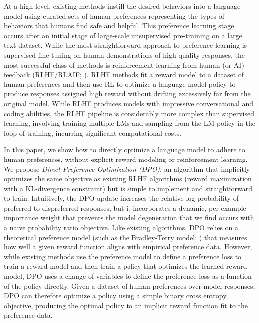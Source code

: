 \documentclass{article}
\newcommand{\rev}[2]{{#2}}
\newcommand{\methodac}{DPO}
\newcommand{\methodfull}{Direct Preference Optimization}
\begin{document}
At a high level, existing methods instill the desired behaviors into a language model using curated sets of human preferences representing the types of behaviors that humans find safe and helpful. This preference learning stage occurs after an initial stage of large-scale unsupervised pre-training on a large text dataset. While the most straightforward approach to preference learning is supervised fine-tuning on human demonstrations of high quality responses, the most successful class of methods is reinforcement learning from human (or AI) feedback (RLHF/RLAIF; \citep{christiano2017deep,bai2022constitutional}). RLHF methods fit a reward model to a dataset of human preferences and then use RL to optimize a language model policy to produce responses assigned high reward without drifting excessively far from the original model. While RLHF produces models with impressive conversational and coding abilities, the RLHF pipeline is considerably more complex than supervised learning, involving training multiple LMs and sampling from the LM policy in the loop of training, incurring significant computational costs.

In this paper, we show how to directly optimize a language model to adhere to human preferences, without explicit reward modeling or reinforcement learning.
We propose
\textit{{\methodfull} (\methodac)}, an algorithm that implicitly optimizes the same objective as existing RLHF algorithms (reward maximization with a KL-divergence constraint) but is simple to implement and straightforward to train. Intuitively, the {\methodac} update increases the relative log probability of preferred to dispreferred responses, but it incorporates a dynamic, per-example importance weight that prevents the model degeneration that we find occurs with a naive probability ratio objective. Like existing algorithms, {\methodac} relies on a theoretical preference model (such as the Bradley-Terry model; \cite{bradley1952rankanalysis}) that measures how well a given reward function aligns with empirical preference data. However, while existing methods use the preference model to define a preference loss to train a reward model and then train a policy that optimizes the learned reward model, {\methodac} uses a change of variables to define the preference loss as a function of the policy directly. Given a dataset of human preferences over model responses, {\methodac} can therefore optimize a policy using a simple binary cross entropy objective, \rev{without learning an explicit, standalone reward model or sampling from the policy during training}{producing the optimal policy to an implicit reward function fit to the preference data}.
\end{document}
